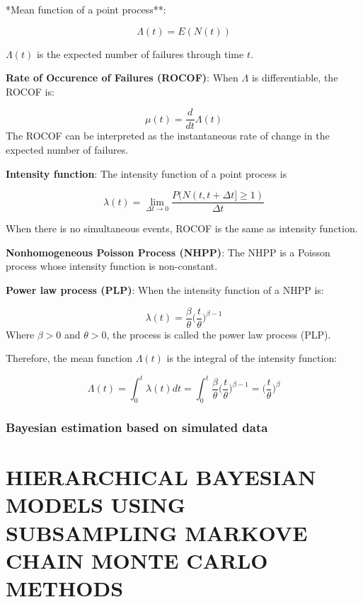 \documentclass[12pt]{book}
\numberwithin{equation}{chapter}
\begin{document}
*Mean function of a point process**:

\[\Lambda(t) = E(N(t))\]

\(\Lambda(t)\) is the expected number of failures through time \(t\).

\textbf{Rate of Occurence of Failures (ROCOF)}: When \(\Lambda\) is differentiable, the ROCOF is:

\[\mu(t) = \frac{d}{dt}\Lambda(t)\]
The ROCOF can be interpreted as the instantaneous rate of change in the expected number of failures.

\textbf{Intensity function}: The intensity function of a point process is

\[\lambda(t) = \lim_{\Delta t \rightarrow 0}\frac{P(N(t, t+\Delta t] \geq 1)}{\Delta t}\]

When there is no simultaneous events, ROCOF is the same as intensity function.

\textbf{Nonhomogeneous Poisson Process (NHPP)}: The NHPP is a Poisson process whose intensity function is non-constant.

\textbf{Power law process (PLP)}: When the intensity function of a NHPP is:

\[\lambda(t) = \frac{\beta}{\theta}\bigg(\frac{t}{\theta}\bigg)^{\beta-1}\]
Where \(\beta > 0\) and \(\theta > 0\), the process is called the power law process (PLP).

Therefore, the mean function \(\Lambda(t)\) is the integral of the intensity function:

\[\Lambda(t) = \int_0^t \lambda(t)dt = \int_0^t \frac{\beta}{\theta}\bigg(\frac{t}{\theta}\bigg)^{\beta-1} = \bigg(\frac{t}{\theta}\bigg)^{\beta}\]

\hypertarget{section}{%
\subsection{}\label{section}}

\hypertarget{bayesian-estimation-based-on-simulated-data-1}{%
\subsection{Bayesian estimation based on simulated data}\label{bayesian-estimation-based-on-simulated-data-1}}

\hypertarget{hierarchical-bayesian-models-using-subsampling-markove-chain-monte-carlo-methods}{%
\chapter{HIERARCHICAL BAYESIAN MODELS USING SUBSAMPLING MARKOVE CHAIN MONTE CARLO METHODS}\label{hierarchical-bayesian-models-using-subsampling-markove-chain-monte-carlo-methods}}
\end{document}

